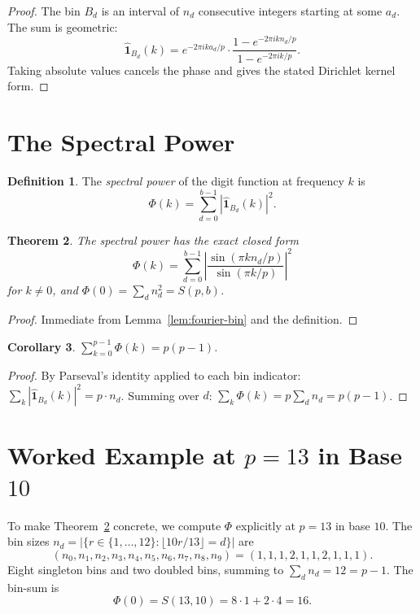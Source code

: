 \documentclass[12pt]{amsart}
\newtheorem{theorem}{Theorem}
\newtheorem{corollary}[theorem]{Corollary}
\theoremstyle{definition}
\newtheorem{definition}[theorem]{Definition}
\theoremstyle{remark}
\begin{document}
\begin{proof}
The bin $B_d$ is an interval of $n_d$ consecutive integers starting
at some $a_d$. The sum is geometric:
\[
\widehat{\mathbf{1}}_{B_d}(k) = e^{-2\pi i k a_d / p}
\cdot \frac{1 - e^{-2\pi i k n_d / p}}{1 - e^{-2\pi i k / p}}.
\]
Taking absolute values cancels the phase and gives the stated
Dirichlet kernel form.
\end{proof}

\section{The Spectral Power}

\begin{definition}
The \emph{spectral power} of the digit function at frequency $k$
is
\[
\Phi(k) = \sum_{d=0}^{b-1}
|\widehat{\mathbf{1}}_{B_d}(k)|^2.
\]
\end{definition}

\begin{theorem}\label{thm:spectral-power}
The spectral power has the exact closed form
\[
\Phi(k) = \sum_{d=0}^{b-1}
\left|
\frac{\sin(\pi k n_d / p)}{\sin(\pi k / p)}
\right|^2
\]
for $k \ne 0$, and $\Phi(0) = \sum_{d} n_d^2 = S(p,b)$.
\end{theorem}

\begin{proof}
Immediate from Lemma~\ref{lem:fourier-bin} and the definition.
\end{proof}

\begin{corollary}\label{cor:parseval}
$\sum_{k=0}^{p-1} \Phi(k) = p(p-1)$.
\end{corollary}

\begin{proof}
By Parseval's identity applied to each bin indicator:
$\sum_k |\widehat{\mathbf{1}}_{B_d}(k)|^2 = p \cdot n_d$.
Summing over $d$: $\sum_k \Phi(k) = p \sum_d n_d = p(p{-}1)$.
\end{proof}

\section{Worked Example at $p = 13$ in Base $10$}\label{sec:example}

To make Theorem~\ref{thm:spectral-power} concrete, we
compute $\Phi$ explicitly at $p = 13$ in base $10$. The
bin sizes $n_d = |\{r \in \{1, \ldots, 12\} :
\lfloor 10r/13 \rfloor = d\}|$ are
\[
(n_0, n_1, n_2, n_3, n_4, n_5, n_6, n_7, n_8, n_9)
= (1, 1, 1, 2, 1, 1, 2, 1, 1, 1).
\]
Eight singleton bins and two doubled bins, summing to
$\sum_d n_d = 12 = p - 1$. The bin-sum is
\[
\Phi(0) = S(13, 10) = 8 \cdot 1 + 2 \cdot 4 = 16.
\]
\end{document}
